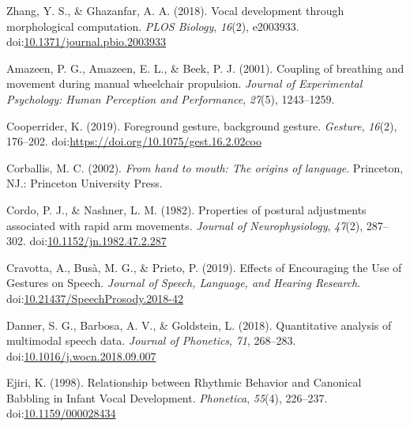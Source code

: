 \documentclass[
  man, noextraspace,floatsintext]{apa6}
\newlength{\cslhangindent}
\newenvironment{cslreferences}%
  {\setlength{\parindent}{0pt}%
  \everypar{\setlength{\hangindent}{\cslhangindent}}\ignorespaces}%
  {\par}
\begin{document}
\begin{cslreferences}
\leavevmode\hypertarget{ref-zhangVocalDevelopmentMorphological2018}{}%
Zhang, Y. S., \& Ghazanfar, A. A. (2018). Vocal development through morphological computation. \emph{PLOS Biology}, \emph{16}(2), e2003933. doi:\href{https://doi.org/10.1371/journal.pbio.2003933}{10.1371/journal.pbio.2003933}

\leavevmode\hypertarget{ref-amazeenCouplingBreathingMovement2001}{}%
Amazeen, P. G., Amazeen, E. L., \& Beek, P. J. (2001). Coupling of breathing and movement during manual wheelchair propulsion. \emph{Journal of Experimental Psychology: Human Perception and Performance}, \emph{27}(5), 1243--1259.

\leavevmode\hypertarget{ref-cooperriderForegroundGestureBackground2019}{}%
Cooperrider, K. (2019). Foreground gesture, background gesture. \emph{Gesture}, \emph{16}(2), 176--202. doi:\href{https://doi.org/https://doi.org/10.1075/gest.16.2.02coo}{https://doi.org/10.1075/gest.16.2.02coo}

\leavevmode\hypertarget{ref-corballisHandMouthOrigins2002}{}%
Corballis, M. C. (2002). \emph{From hand to mouth: The origins of language}. Princeton, NJ.: Princeton University Press.

\leavevmode\hypertarget{ref-cordoPropertiesPosturalAdjustments1982}{}%
Cordo, P. J., \& Nashner, L. M. (1982). Properties of postural adjustments associated with rapid arm movements. \emph{Journal of Neurophysiology}, \emph{47}(2), 287--302. doi:\href{https://doi.org/10.1152/jn.1982.47.2.287}{10.1152/jn.1982.47.2.287}

\leavevmode\hypertarget{ref-cravottaEffectsEncouragingUse2019}{}%
Cravotta, A., Busà, M. G., \& Prieto, P. (2019). Effects of Encouraging the Use of Gestures on Speech. \emph{Journal of Speech, Language, and Hearing Research}. doi:\href{https://doi.org/10.21437/SpeechProsody.2018-42}{10.21437/SpeechProsody.2018-42}

\leavevmode\hypertarget{ref-dannerQuantitativeAnalysisMultimodal2018}{}%
Danner, S. G., Barbosa, A. V., \& Goldstein, L. (2018). Quantitative analysis of multimodal speech data. \emph{Journal of Phonetics}, \emph{71}, 268--283. doi:\href{https://doi.org/10.1016/j.wocn.2018.09.007}{10.1016/j.wocn.2018.09.007}

\leavevmode\hypertarget{ref-ejiriRelationshipRhythmicBehavior1998}{}%
Ejiri, K. (1998). Relationship between Rhythmic Behavior and Canonical Babbling in Infant Vocal Development. \emph{Phonetica}, \emph{55}(4), 226--237. doi:\href{https://doi.org/10.1159/000028434}{10.1159/000028434}


\end{cslreferences}
\end{document}
